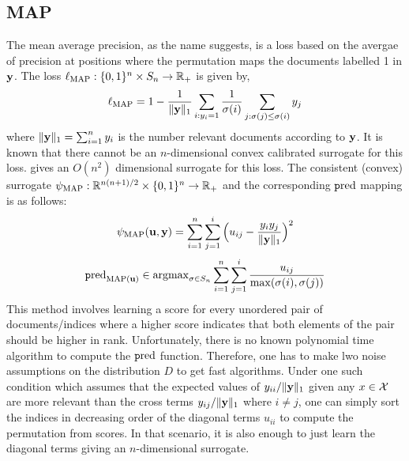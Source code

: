 \subsection{MAP}
The mean average precision, as the name suggests, is a loss based on the avergae of precision at positions where the permutation maps the documents labelled 1 in ${\mathbf y}$. The loss $\ell_{\text{MAP}}:\{0,1\}^n \times S_n \to {\mathbb R}_+$ is given by,
$$\ell_{\text{MAP}} = 1 - \frac{1}{\lVert{\mathbf y}\rVert_1}\sum_{i:y_i = 1}\frac{1}{\sigma(i)}\sum_{j:\sigma(j) \leq \sigma(i)}y_j$$
where $\lVert{\mathbf y}\rVert_1 = \sum_{i=1}^ny_i$ is the number relevant documents according to ${\mathbf y}$. It is known that there cannot be an $n$-dimensional convex calibrated surrogate for this loss. \cite{ramaswamy2013convex} gives an $O(n^2)$ dimensional surrogate for this loss. The consistent (convex) surrogate $\psi_{\text{MAP}}:  {\mathbb R}^{n(n+1)/2} \times \{0,1\}^n \to {\mathbb R}_+$ and the corresponding $\text{\texttt pred}$ mapping is as follows:
$$\psi_{\text{MAP}}({\mathbf u},{\mathbf y}) = \sum_{i=1}^n\sum_{j=1}^i\Big(u_{ij} - \frac{y_iy_j}{\lVert{\mathbf y}\rVert_1}\Big)^2$$
$$\text{\texttt pred}_{\text{MAP}({\mathbf u})} \in \textup{\textrm{argmax}}_{\sigma\in S_n}\sum_{i=1}^n\sum_{j=1}^i \frac{u_{ij}}{\max(\sigma(i),\sigma(j))}$$
This method involves learning a score for every unordered pair of documents/indices where a higher score indicates that both elements of the pair should be higher in rank. Unfortunately, there is no known polynomial time algorithm to compute the $\text{\texttt pred}$ function. Therefore, one has to make lwo noise assumptions on the distribution $D$ to get fast algorithms. Under one such condition which assumes that the expected values of $y_{ii}/\lVert{\mathbf y}\rVert_1$ given any $x \in {\mathcal X}$ are more relevant than the cross terms $y_{ij}/\lVert{\mathbf y}\rVert_1$ where $i \neq j$, one can simply sort the indices in decreasing order of the diagonal terms $u_{ii}$ to compute the permutation from scores. In that scenario, it is also enough to just learn the diagonal terms giving an $n$-dimensional surrogate.  